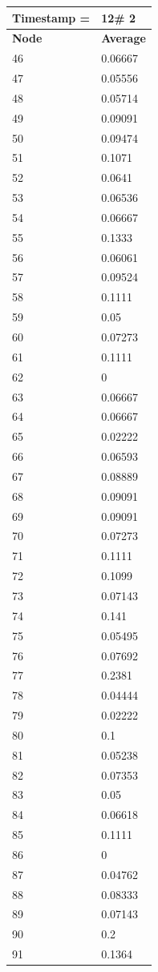 \begin{tabular}{|l||l|}
\hline
\textbf{Timestamp =} & \textbf{12}\# 2\\\hline
	\textbf{Node} & \textbf{Average} \\ \hline
\hline
	46 & 0.06667 \\ \hline
	47 & 0.05556 \\ \hline
	48 & 0.05714 \\ \hline
	49 & 0.09091 \\ \hline
	50 & 0.09474 \\ \hline
	51 & 0.1071 \\ \hline
	52 & 0.0641 \\ \hline
	53 & 0.06536 \\ \hline
	54 & 0.06667 \\ \hline
	55 & 0.1333 \\ \hline
	56 & 0.06061 \\ \hline
	57 & 0.09524 \\ \hline
	58 & 0.1111 \\ \hline
	59 & 0.05 \\ \hline
	60 & 0.07273 \\ \hline
	61 & 0.1111 \\ \hline
	62 & 0 \\ \hline
	63 & 0.06667 \\ \hline
	64 & 0.06667 \\ \hline
	65 & 0.02222 \\ \hline
	66 & 0.06593 \\ \hline
	67 & 0.08889 \\ \hline
	68 & 0.09091 \\ \hline
	69 & 0.09091 \\ \hline
	70 & 0.07273 \\ \hline
	71 & 0.1111 \\ \hline
	72 & 0.1099 \\ \hline
	73 & 0.07143 \\ \hline
	74 & 0.141 \\ \hline
	75 & 0.05495 \\ \hline
	76 & 0.07692 \\ \hline
	77 & 0.2381 \\ \hline
	78 & 0.04444 \\ \hline
	79 & 0.02222 \\ \hline
	80 & 0.1 \\ \hline
	81 & 0.05238 \\ \hline
	82 & 0.07353 \\ \hline
	83 & 0.05 \\ \hline
	84 & 0.06618 \\ \hline
	85 & 0.1111 \\ \hline
	86 & 0 \\ \hline
	87 & 0.04762 \\ \hline
	88 & 0.08333 \\ \hline
	89 & 0.07143 \\ \hline
	90 & 0.2 \\ \hline
	91 & 0.1364 \\ \hline
\end{tabular}
